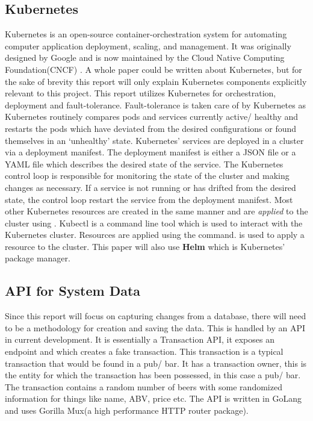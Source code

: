 \begin{flushleft}
	\subsection{Kubernetes}
	Kubernetes is an open-source container-orchestration system for automating computer application deployment, scaling, and management. It was originally designed
	by Google and is now maintained by the Cloud Native Computing Foundation(CNCF) \autocite{ProductionGradeContainerOrchestration}. A whole paper could be written about Kubernetes,
	but for the sake of brevity this report will only explain Kubernetes components explicitly relevant to this project. This report utilizes Kubernetes for orchestration,
	deployment and fault-tolerance.
	\newline Fault-tolerance is taken care of by Kubernetes as Kubernetes routinely compares pods and services currently active/ healthy and restarts the pods
	which have deviated from the desired configurations or found themselves in an `unhealthy' state.\newline
	Kubernetes' services are deployed in a cluster via a deployment manifest. The deployment manifest is either a JSON file or a YAML file which describes the desired state
	of the service. The Kubernetes control loop is responsible for monitoring the state of the cluster and making changes as necessary. If a service is not running or has drifted
	from the desired state, the control loop restart the service from the deployment manifest.
	\bigbreak
	Most other Kubernetes resources are created in the same manner and are \emph{applied} to the cluster using . Kubectl is a command line tool which is used to
	interact with the Kubernetes cluster. Resources are applied using the  command.  is used to apply a resource to the cluster. \newline
	This paper will also use \textbf{Helm} which is Kubernetes' package manager\autocite{UsingHelm}.
	\subsection{API for System Data}
	Since this report will focus on capturing changes from a database, there will need to be a methodology for creation and saving the data.
	This is handled by an API in current development. It is essentially a Transaction API, it exposes an endpoint and which creates a fake transaction. This
	transaction is a typical transaction that would be found in a pub/ bar. It has a transaction owner, this is the entity for which the transaction has been
	possessed, in this case a pub/ bar. The transaction contains a random number of beers with some randomized information for things like name, ABV,
	price etc. The API is written in GoLang and uses Gorilla Mux(a high performance HTTP router package).

\end{flushleft}
